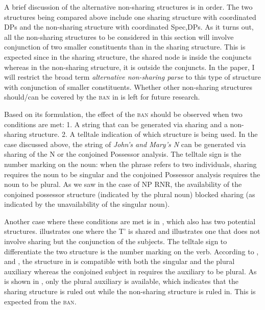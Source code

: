 \documentclass[output=paper]{langscibook}
\begin{document}
A brief discussion of the alternative non-sharing structures is in order. The two structures being compared above include one sharing structure with coordinated DPs and the non-sharing structure with coordinated Spec,DPs. As it turns out, all the non-sharing structures to be considered in this section will involve conjunction of two smaller constituents than in the sharing structure. This is expected since in the sharing structure, the shared node is inside the conjuncts whereas in the non-sharing structure, it is outside the conjuncts. In the paper, I will restrict the broad term \emph{alternative non-sharing parse} to this type of structure with conjunction of smaller constituents. Whether other non-sharing structures should/can be covered by the \textsc{ban} in  is left for future research.

Based on its formulation, the effect of the \textsc{ban} should be observed when two conditions are met: 1. A string that can be generated via sharing and a non-sharing structure. 2. A telltale indication of which structure is being used. In the case discussed above, the string of \emph{John's and Mary's N} can be generated via sharing of the N or the conjoined Possessor analysis. The telltale sign is the number marking on the noun: when the phrase refers to two individuals, sharing requires the noun to be singular and the conjoined Possessor analysis requires the noun to be plural. As we saw in the case of NP RNR, the availability of the conjoined possessor structure (indicated by the plural noun) blocked sharing (as indicated by the unavailability of the singular noun).

Another case where these conditions are met is in , which also has two potential structures.  illustrates one where the T' is shared and  illustrates one that does not involve sharing but the conjunction of the subjects. The telltale sign to differentiate the two structure is the number marking on the verb. According to \citet{Kluck:2009, Grosz:2015}, and \citet{Shen:2019}, the structure in  is compatible with both the singular and the plural auxiliary whereas the conjoined subject in  requires the auxiliary to be plural. As is shown in , only the plural auxiliary is available, which indicates that the sharing structure  is ruled out while the non-sharing structure  is ruled in. This is expected from the \textsc{ban}.
\end{document}
